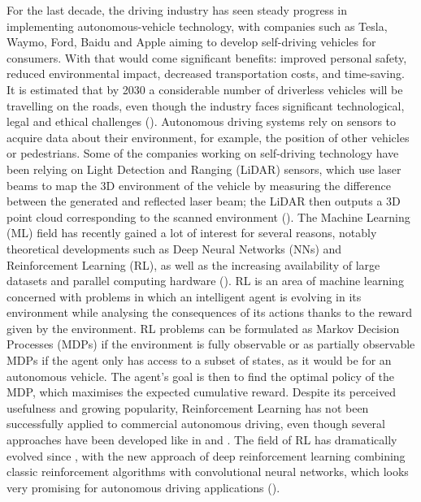 For the last decade, the driving industry has seen steady progress in implementing autonomous-vehicle technology, with companies such as Tesla, Waymo, Ford, Baidu and Apple aiming to develop self-driving vehicles for consumers. With that would come significant benefits: improved personal safety, reduced environmental impact, decreased transportation costs, and time-saving. It is estimated that by 2030 a considerable number of driverless vehicles will be travelling on the roads, even though the industry faces significant technological, legal and ethical challenges (\cite{Barab_s_2017}). Autonomous driving systems rely on sensors to acquire data about their environment, for example, the position of other vehicles or pedestrians. Some of the companies working on self-driving technology have been relying on Light Detection and Ranging (LiDAR) sensors, which use laser beams to map the 3D environment of the vehicle by measuring the difference between the generated and reflected laser beam; the LiDAR then outputs a 3D point cloud corresponding to the scanned environment (\cite{lidar}).
	\newline
The Machine Learning (ML) field has recently gained a lot of interest for several reasons, notably theoretical developments such as Deep Neural Networks (NNs) and Reinforcement Learning (RL), as well as the increasing availability of large datasets and parallel computing hardware (\cite{smart}). RL is an area of machine learning concerned with problems in which an intelligent agent is evolving in its environment while analysing the consequences of its actions thanks to the reward given by the environment. RL problems can be formulated as Markov Decision Processes (MDPs) if the environment is fully observable or as partially observable MDPs if the agent only has access to a subset of states, as it would be for an autonomous vehicle. The agent's goal is then to find the optimal policy of the MDP, which maximises the expected cumulative reward. Despite its perceived usefulness and growing popularity, Reinforcement Learning has not been successfully applied to commercial autonomous driving, even though several approaches have been developed like in \cite{Reference2} and \cite{Reference3}. The field of RL has dramatically evolved since \cite{watkins1989}, with the new approach of deep reinforcement learning combining classic reinforcement algorithms with convolutional neural networks, which looks very promising for autonomous driving applications (\cite{Reference4}).
	\newline
